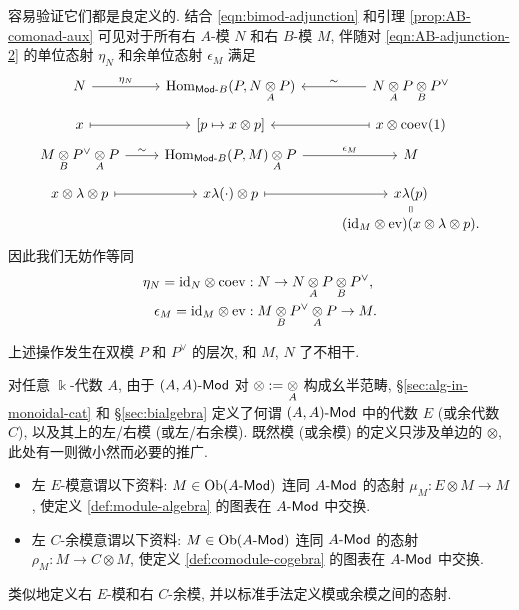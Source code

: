 容易验证它们都是良定义的. 结合 \eqref{eqn:bimod-adjunction} 和引理 \ref{prop:AB-comonad-aux} 可见对于所有右 $A$-模 $N$ 和右 $B$-模 $M$, 伴随对 \eqref{eqn:AB-adjunction-2} 的单位态射 $\eta_N$ 和余单位态射 $\epsilon_M$ 满足
\[\begin{tikzcd}[row sep=tiny]
	N \arrow[r, "\eta_N"] & \Hom_{\cated{Mod}B}(P, N \dotimes{A} P) & N \dotimes{A} P \dotimes{B} P^\vee \arrow[l, "\sim"'] \\
	x \arrow[mapsto, r] & {[p \mapsto x \otimes p]} & x \otimes \mathrm{coev}(1) \arrow[mapsto, l] \\
	M \dotimes{B} P^\vee \dotimes{A} P \arrow[r, "\sim"] & \Hom_{\cated{Mod}B}(P, M) \dotimes{A} P \arrow[r, "\epsilon_M"] & M \\
	x \otimes \lambda \otimes p \arrow[mapsto, r] & x \lambda(\cdot) \otimes p \arrow[mapsto, r] & x\lambda(p) \arrow[equal, d] \\
	& & (\identity_M \otimes \mathrm{ev})(x \otimes \lambda \otimes p).
\end{tikzcd}\]
因此我们无妨作等同
\begin{align*}
	\eta_N = \mathrm{id}_N \otimes \mathrm{coev}: \; & N \to N \underset{A}{\otimes} P \underset{B}{\otimes} P^\vee , \\
	\epsilon_M = \mathrm{id}_M \otimes \mathrm{ev}: \; & M \underset{B}{\otimes} P^\vee \underset{A}{\otimes} P \to M.
\end{align*}

上述操作发生在双模 $P$ 和 $P^\vee$ 的层次, 和 $M$, $N$ 了不相干.

\begin{definition}\label{def:cogebroid}
	 
	对任意 $\Bbbk$-代数 $A$, 由于 $(A, A)\text{-}\mathsf{Mod}$ 对 $\otimes := \underset{A}{\otimes}$ 构成幺半范畴, \S\ref{sec:alg-in-monoidal-cat} 和 \S\ref{sec:bialgebra} 定义了何谓 $(A, A)\text{-}\mathsf{Mod}$ 中的代数 $E$ (或余代数 $C$), 以及其上的左/右模 (或左/右余模). 既然模 (或余模) 的定义只涉及单边的 $\otimes$, 此处有一则微小然而必要的推广.
	\begin{itemize}
		\item 左 $E$-模意谓以下资料: $M \in \operatorname{Ob}(A\text{-}\mathsf{Mod})$ 连同 $A\text{-}\mathsf{Mod}$ 的态射 $\mu_M: E \otimes M \to M$, 使定义 \ref{def:module-algebra} 的图表在 $A\text{-}\mathsf{Mod}$ 中交换.
		
		\item 左 $C$-余模意谓以下资料: $M \in \operatorname{Ob}(A\text{-}\mathsf{Mod})$ 连同 $A\text{-}\mathsf{Mod}$ 的态射 $\rho_M: M \to C \otimes M$, 使定义 \ref{def:comodule-cogebra} 的图表在 $A\text{-}\mathsf{Mod}$ 中交换.
	\end{itemize}
	类似地定义右 $E$-模和右 $C$-余模, 并以标准手法定义模或余模之间的态射. 
\end{definition}

